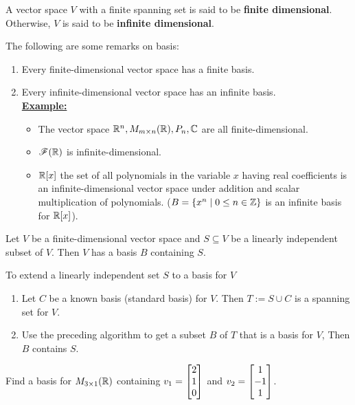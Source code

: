 \begin{definition}
A vector space $V$ with a finite spanning set is said to be \textbf{finite dimensional}. Otherwise, $V$ is said to be \textbf{infinite dimensional}.
\end{definition}

\newpage
\begin{remark}The following are some remarks on basis:
\begin{enumerate}
    \item Every finite-dimensional vector space has a finite basis.
    \item Every infinite-dimensional vector space has an infinite basis.\\
    \underline{\textbf{Example:}}
    \leavevmode
    \begin{itemize}
        \item The vector space $\mathbb{R}^n, M_{m \times n}(\mathbb{R}), P_n, \mathbb{C}$ are all finite-dimensional.
        \item $\mathscr{F}(\mathbb{R})$ is infinite-dimensional.
        \item $\mathbb{R}[x]$ the set of all polynomials in the variable $x$ having real coefficients is an infinite-dimensional vector space under addition and scalar multiplication of polynomials. ($B = \{x^n \mid 0 \leq n \in \mathbb{Z}\}$ is an infinite basis for $\mathbb{R}[x]$).
    \end{itemize}
\end{enumerate}
\end{remark}

\begin{theorem}
Let $V$ be a finite-dimensional vector space and $S \subseteq V$ be a linearly independent subset of $V$. Then $V$ has a basis $B$ containing $S$.

To extend a linearly independent set $S$ to a basis for $V$
\begin{enumerate}
    \item Let $C$ be a known basis (standard basis) for $V$. Then $T := S \cup C$ is a spanning set for $V$.
    \item Use the preceding algorithm to get a subset $B$ of $T$ that is a basis for $V$, Then $B$ contains $S$.
\end{enumerate}
\end{theorem}

\begin{example}
Find a basis for $M_{3 \times 1}(\mathbb{R})$ containing $v_1 = \begin{bmatrix} 2 \\ 1 \\ 0 \end{bmatrix}$ and $v_2 = \begin{bmatrix} 1 \\ -1 \\ 1 \end{bmatrix}$.
\end{example}

